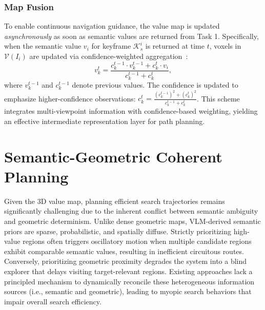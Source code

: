 \subsubsection{Map Fusion}
To enable continuous navigation guidance, the value map is updated \textit{asynchronously} as soon as semantic values are returned from Task 1.
Specifically, when the semantic value $v_i$ for keyframe $\mathcal{K}_s^i$ is returned at time $t$, voxels in $\mathcal{V}(I_i)$ are updated via confidence-weighted aggregation~\cite{yokoyama2024vlfm}:
\begin{equation}
    v_k^t = \frac{c_k^{t-1} \cdot v_k^{t-1} + c_k^t \cdot v_i}{c_k^{t-1} + c_k^t},
\end{equation}
where $v_k^{t-1}$ and $c_k^{t-1}$ denote previous values. The confidence is updated to emphasize higher-confidence observations: $c_k^t = \frac{(c_k^{t-1})^2 + (c_k^t)^2}{c_k^{t-1} + c_k^t}$.
This scheme integrates multi-viewpoint information with confidence-based weighting, yielding an effective intermediate representation layer for path planning.


\section{Semantic-Geometric Coherent Planning}\label{V}
Given the 3D value map, planning efficient search trajectories remains significantly challenging due to the inherent conflict between semantic ambiguity and geometric determinism. Unlike dense geometric maps, VLM-derived semantic priors are sparse, probabilistic, and spatially diffuse. Strictly prioritizing high-value regions often triggers oscillatory motion when multiple candidate regions exhibit comparable semantic values, resulting in inefficient circuitous routes. Conversely, prioritizing geometric proximity degrades the system into a blind explorer that delays visiting target-relevant regions. Existing 
approaches lack a principled mechanism to dynamically reconcile these heterogeneous information sources (i.e., semantic and geometric), leading to myopic search behaviors that impair overall search efficiency.


